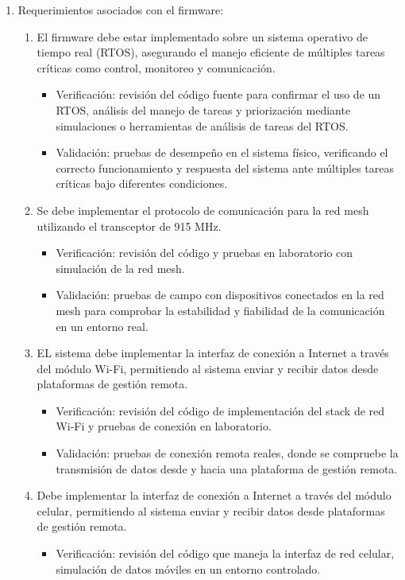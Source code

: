 \documentclass[
11pt, %
]{charter}
\begin{document}
\begin{enumerate}
	\item Requerimientos asociados con el firmware:
		\begin{enumerate}		
			\item El firmware debe estar implementado sobre un sistema operativo de tiempo real (RTOS), asegurando el manejo eficiente de múltiples tareas críticas como control, monitoreo y comunicación.
				\begin{itemize}
				\item Verificación: revisión del código fuente para confirmar el uso de un RTOS, análisis del manejo de tareas y priorización mediante simulaciones o herramientas de análisis de tareas del RTOS.
				\item Validación: pruebas de desempeño en el sistema físico, verificando el correcto funcionamiento y respuesta del sistema ante múltiples tareas 	críticas bajo diferentes condiciones.
				\end{itemize}
			\item Se debe implementar el protocolo de comunicación para la red mesh utilizando el transceptor de 915 MHz.
				\begin{itemize}
				\item Verificación: revisión del código y pruebas en laboratorio con simulación de la red mesh.
				\item Validación: pruebas de campo con dispositivos conectados en la red mesh para comprobar la estabilidad y fiabilidad de la comunicación en un entorno real.
				\end{itemize}
			\item EL sistema debe implementar la interfaz de conexión a Internet a través del módulo Wi-Fi, permitiendo al sistema enviar y recibir datos desde plataformas de gestión remota.
				\begin{itemize}
				\item Verificación: revisión del código de implementación del stack de red Wi-Fi y pruebas de conexión en laboratorio.
				\item Validación: pruebas de conexión remota reales, donde se compruebe la transmisión de datos desde y hacia una plataforma de gestión remota.
				\end{itemize}
			\item Debe implementar la interfaz de conexión a Internet a través del módulo celular, permitiendo al sistema enviar y recibir datos desde plataformas de gestión remota.
				\begin{itemize}
				\item Verificación: revisión del código que maneja la interfaz de red celular, simulación de datos móviles en un entorno controlado.

\end{itemize}
\end{enumerate}
\end{enumerate}
\end{document}

